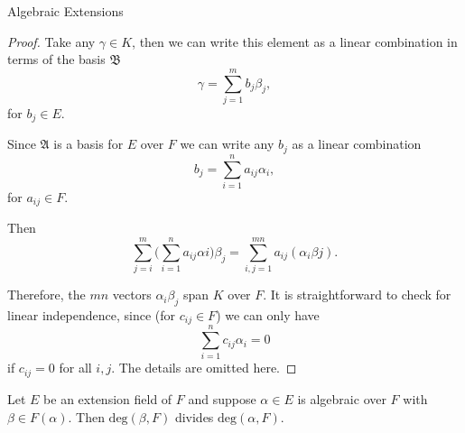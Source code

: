 \begin{section}{Algebraic Extensions}
\begin{proof}
Take any $\gamma \in K$, then we can write this element as a linear combination in terms of the basis $\mathfrak{B}$
$$\gamma = \sum_{j=1}^{m}b_{j}\beta_{j},$$ for $b_{j} \in E$. 

Since $\mathfrak{A}$ is a basis for $E$ over $F$ we can write any $b_{j}$ as a linear combination
$$b_{j} = \sum_{i=1}^{n}a_{ij}\alpha_{i},$$ for $a_{ij} \in F$.

Then $$\sum_{j=i}^{m} \Big (\sum_{i=1}^{n} a_{ij}\alpha{i} \Big ) \beta_{j} = \sum_{i,j=1}^{mn} a_{ij}(\alpha_{i}\beta{j}).$$

Therefore, the $mn$ vectors $\alpha_{i}\beta_{j}$ span $K$ over $F$. It is straightforward to check for linear independence, since (for $c_{ij} \in F$) we can only have 
$$\sum_{i=1}^{n}c_{ij}\alpha_{i} = 0$$ if $c_{ij} = 0$ for all $i,j$. The details are omitted here.
\end{proof}

\begin{prop}
Let $E$ be an extension field of $F$ and suppose $\alpha \in E$ is algebraic over $F$ with $\beta \in F(\alpha)$. Then $\textrm{deg}(\beta, F)$ divides $\textrm{deg}(\alpha, F)$.
\end{prop}

\end{section} 